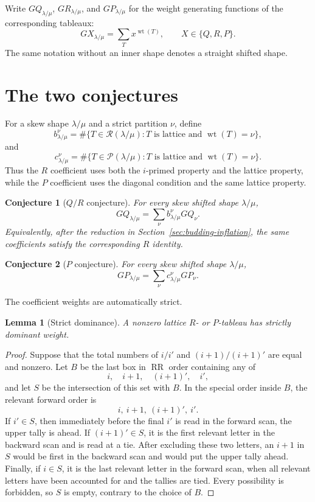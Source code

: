 \documentclass[11pt]{article}
\newtheorem{conjecture}{Conjecture}
\newtheorem{lemma}{Lemma}
\theoremstyle{definition}
\theoremstyle{remark}
\newcommand{\wt}{\operatorname{wt}}
\newcommand{\RR}{\operatorname{RR}}
\newcommand{\cR}{\mathcal{R}}
\newcommand{\cP}{\mathcal{P}}
\begin{document}
Write $GQ_{\lambda/\mu}$, $GR_{\lambda/\mu}$, and $GP_{\lambda/\mu}$ for the
weight generating functions of the corresponding tableaux:
\[
  G\!X_{\lambda/\mu}=\sum_T x^{\wt(T)},
  \qquad X\in\{Q,R,P\}.
\]
The same notation without an inner shape denotes a straight shifted shape.

\section{The two conjectures}

For a skew shape $\lambda/\mu$ and a strict partition $\nu$, define
\[
 b_{\lambda/\mu}^{\nu}
 =\#\{T\in\cR(\lambda/\mu):T\text{ is lattice and }\wt(T)=\nu\},
\]
and
\[
 c_{\lambda/\mu}^{\nu}
 =\#\{T\in\cP(\lambda/\mu):T\text{ is lattice and }\wt(T)=\nu\}.
\]
Thus the $R$ coefficient uses both the $i$-primed property and the lattice
property, while the $P$ coefficient uses the diagonal condition and the same
lattice property.

\begin{conjecture}[$Q/R$ conjecture]
For every skew shifted shape $\lambda/\mu$,
\[
  GQ_{\lambda/\mu}
  =\sum_{\nu} b_{\lambda/\mu}^{\nu}GQ_\nu.
\]
Equivalently, after the reduction in Section~\ref{sec:budding-inflation}, the
same coefficients satisfy the corresponding $R$ identity.
\end{conjecture}

\begin{conjecture}[$P$ conjecture]
For every skew shifted shape $\lambda/\mu$,
\[
  GP_{\lambda/\mu}
  =\sum_{\nu} c_{\lambda/\mu}^{\nu}GP_\nu.
\]
\end{conjecture}

The coefficient weights are automatically strict.

\begin{lemma}[Strict dominance]
A nonzero lattice $R$- or $P$-tableau has strictly dominant weight.
\end{lemma}

\begin{proof}
Suppose that the total numbers of $i/i'$ and $(i+1)/(i+1)'$ are equal and
nonzero.  Let $B$ be the last box in $\RR$ order containing any of
\[
  i,\quad i+1,\quad (i+1)',\quad i',
\]
and let $S$ be the intersection of this set with $B$.  In the special order
inside $B$, the relevant forward order is
\[
  i,\ i+1,\ (i+1)',\ i'.
\]
If $i'\in S$, then immediately before the final $i'$ is read in the forward
scan, the upper tally is ahead.  If $(i+1)'\in S$, it is the first relevant
letter in the backward scan and is read at a tie.  After excluding these two
letters, an $i+1$ in $S$ would be first in the backward scan and would put the
upper tally ahead.  Finally, if $i\in S$, it is the last relevant letter in the
forward scan, when all relevant letters have been accounted for and the
tallies are tied.  Every possibility is forbidden, so $S$ is empty, contrary
to the choice of $B$.
\end{proof}
\end{document}
